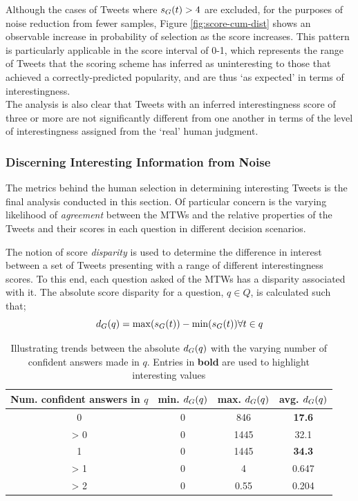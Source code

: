 Although the cases of Tweets where $s_G(t) > 4$ are excluded, for the purposes of noise reduction from fewer samples, Figure \ref{fig:score-cum-dist} shows an observable increase in probability of selection as the score increases. This pattern is particularly applicable in the score interval of 0-1, which represents the range of Tweets that the scoring scheme has inferred as uninteresting to those that achieved a correctly-predicted popularity, and are thus `as expected' in terms of interestingness.\\
The analysis is also clear that Tweets with an inferred interestingness score of three or more are not significantly different from one another in terms of the level of interestingness assigned from the `real' human judgment.


\subsubsection{Discerning Interesting Information from Noise}
The metrics behind the human selection in determining interesting Tweets is the final analysis conducted in this section. Of particular concern is the varying likelihood of \textit{agreement} between the MTWs and the relative properties of the Tweets and their scores in each question in different decision scenarios.

The notion of score \textit{disparity} is used to determine the difference in interest between a set of Tweets presenting with a range of different interestingness scores. To this end, each question asked of the MTWs has a disparity associated with it. The absolute score disparity for a question, $q \in Q$, is calculated such that;
\[
    d_G(q) = \max(s_G(t)) - \min(s_G(t)) \forall t \in q
\]

\begin{table}[h]\footnotesize
\centering
\begin{tabular}{ c | c | c | c }
	 Num. confident answers in $q$ & min. $d_G(q)$ & max. $d_G(q)$ & avg. $d_G(q)$ \\
	 \hline
	0 & 0 & 846 & \textbf{17.6} \\
	> 0 & 0 & 1445 & 32.1 \\
	1 & 0 & 1445 & \textbf{34.3} \\
	> 1 & 0 & 4 & 0.647 \\
	> 2 & 0 & 0.55 & 0.204
\end{tabular}
\caption{Illustrating trends between the absolute $d_G(q)$ with the varying number of confident answers made in $q$. Entries in \textbf{bold} are used to highlight interesting values}
\label{table:score_disparities}
\end{table}

